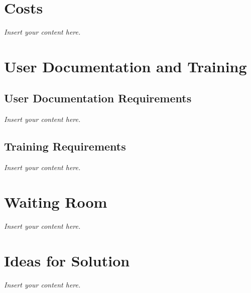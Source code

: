 \documentclass[a4paper, 12pt,twoside]{article}
\newcommand{\lips}{\textit{Insert your content here.}}
\begin{document}
\section{Costs}
\lips
\section{User Documentation and Training}
\subsection{User Documentation Requirements}
\lips
\subsection{Training Requirements}
\lips

\section{Waiting Room}
\lips

\section{Ideas for Solution}
\lips
\end{document}
